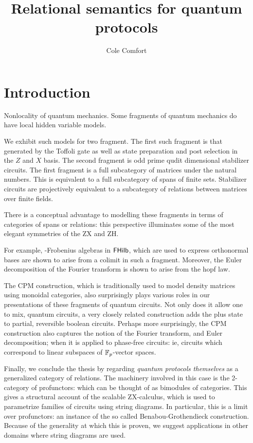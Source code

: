 \documentclass[12pt]{ociamthesis}  %
\title{Relational semantics for quantum protocols}
\author{Cole Comfort}
\begin{document}
\maketitle

\tableofcontents


\chapter{Introduction}


Nonlocality of quantum mechanics. Some fragments of quantum mechanics do have local hidden variable models.

  We exhibit such models for two fragment. The first such fragment is that generated by the Toffoli gate as well as state preparation and post selection in the $Z$ and $X$ basis.  The second fragment is odd prime qudit dimensional stabilizer circuits.  The first fragment is a full subcategory of matrices under the natural numbers.  This is equivalent to a full subcategory of spans of finite sets.
Stabilizer circuits are projectively equivalent to a subcategory of relations between matrices over finite fields.

There is a conceptual advantage to modelling these fragments in terms of categories of spans or relations:  this perspective illuminates some of the most elegant symmetries of the ZX and ZH.

For example, \dag-Frobenius algebras in $\mathsf{FHilb}$, which are used to express orthonormal bases are shown to arise from a colimit in such a fragment.  Moreover, the Euler decomposition of the Fourier transform is shown to arise from the hopf law.

The CPM construction, which is traditionally used to model density matrices using monoidal categories, also surprisingly plays various roles in our presentations of these fragments of quantum circuits.  Not only does it allow one to mix, quantum circuits, a very closely related construction adds the plus state to partial, reversible boolean circuits.  Perhaps more surprisingly, the CPM construction also captures the notion of the Fourier transform, and Euler decomposition; when it is applied to phase-free circuits: ie, circuits which correspond to linear subspaces of $\mathbb{F}_p$-vector spaces.

Finally, we conclude the thesis by regarding {\em quantum protocols themselves} as a generalized category of relations.  The machinery involved in this case is the 2-category of profunctors: which can be thought of as bimodules of categories.  This gives a structural account of the scalable ZX-calculus, which is used to parametrize families of circuits using string diagrams.  In particular, this is a limit over profunctors: an instance of the so called Benabou-Grothendieck construction.  Because of the generality at which this is proven, we suggest applications in other domains where string diagrams are used. 
\end{document}
